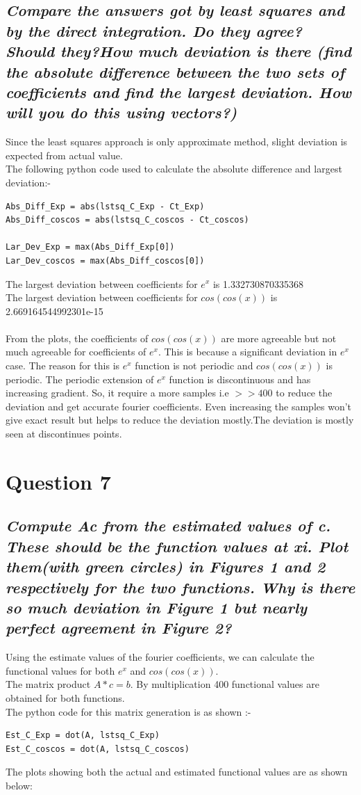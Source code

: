 \documentclass[11pt, a4paper]{article}
\begin{document}
\subsection*{\textsl{Compare the answers got by least squares and by the direct integration. Do they agree? Should they?How much deviation is there (find the absolute difference between the two sets of coefficients and find the largest deviation. How will you do this using vectors?)}}
Since the least squares approach is only approximate method, slight deviation is expected from actual value.\\
The following python code used to calculate the absolute difference and largest deviation:-
\begin{verbatim}	
Abs_Diff_Exp = abs(lstsq_C_Exp - Ct_Exp)  
Abs_Diff_coscos = abs(lstsq_C_coscos - Ct_coscos)

Lar_Dev_Exp = max(Abs_Diff_Exp[0]) 
Lar_Dev_coscos = max(Abs_Diff_coscos[0])
\end{verbatim}
The largest deviation between coefficients for $e^{x}$ is 1.332730870335368\\
The largest deviation between coefficients for $cos(cos(x))$ is  2.669164544992301e-15\\\\
From the plots, the coefficients of $cos(cos(x))$ are more agreeable but not much agreeable for coefficients of $e^{x}$. This is because a significant deviation in $e^x$ case. The reason for this is $e^{x}$ function is not periodic and  $cos(cos(x))$ is periodic. The periodic extension of $e^{x}$ function is discontinuous and has increasing gradient. So, it require a more samples i.e $>>400$ to reduce the deviation and get accurate fourier coefficients. Even increasing the samples won't give exact result but helps to reduce the deviation mostly.The deviation is mostly seen at discontinues points.   


\section{Question 7}
\subsection*{\textsl{Compute Ac from the estimated values of c.  These should be the function values at xi. Plot them(with green circles) in Figures 1 and 2 respectively for the two functions.  Why is there so much deviation in Figure 1 but nearly perfect agreement in Figure 2?}}
Using the estimate values of the fourier coefficients, we can calculate the functional values for both $e^{x}$ and $cos(cos(x))$. \\
The matrix product $A*c=b$. By multiplication 400 functional values are obtained for both functions.\\
The python code for this matrix generation is as shown :-
\begin{verbatim}
Est_C_Exp = dot(A, lstsq_C_Exp) 
Est_C_coscos = dot(A, lstsq_C_coscos)
\end{verbatim}
The plots showing both the actual and estimated functional values are as shown below:
\end{document}
